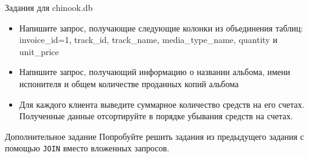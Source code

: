 \documentclass{beamer}
\begin{document}
\begin{frame}[fragile]{Задания для chinook.db}
	\begin{itemize}
		\item Напишите запрос, получающие следующие колонки из объединения таблиц: invoice\_id=1, track\_id, track\_name, media\_type\_name, quantity и unit\_price
		\item Напишите запрос, получающий информацию о названии альбома, имени испонителя и общем количестве проданных копий альбома
		\item Для каждого клиента выведите суммарное количество средств на его счетах. Полученные данные отсортируйте в порядке убывания средств на счетах.
	\end{itemize}
\end{frame}

\begin{frame}[fragile]{Дополнительное задание}
	Попробуйте решить задания из предыдущего задания с помощью \texttt{JOIN} вместо вложенных запросов.
\end{frame}
\end{document}
